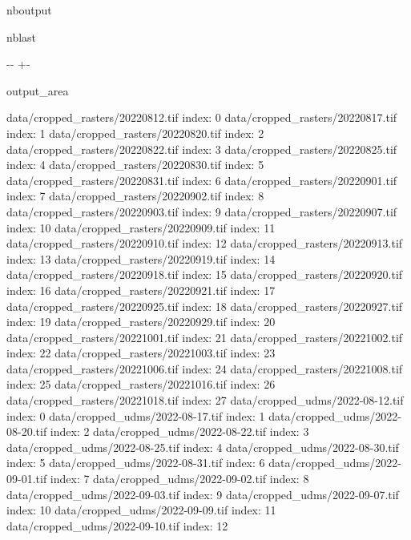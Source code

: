 \documentclass[letterpaper,10pt]{sphinxmanual}
\newlength\nbsphinxcodecellspacing
\begin{document}
\begin{sphinxuseclass}{nboutput}
\begin{sphinxuseclass}{nblast}
{

\kern-\sphinxverbatimsmallskipamount\kern-\baselineskip
\kern+\FrameHeightAdjust\kern-\fboxrule
\vspace{\nbsphinxcodecellspacing}

\begin{sphinxuseclass}{output_area}
\begin{sphinxuseclass}{}


\begin{sphinxVerbatim}[commandchars=\\\{\}]
data/cropped\_rasters/20220812.tif  index:  0
data/cropped\_rasters/20220817.tif  index:  1
data/cropped\_rasters/20220820.tif  index:  2
data/cropped\_rasters/20220822.tif  index:  3
data/cropped\_rasters/20220825.tif  index:  4
data/cropped\_rasters/20220830.tif  index:  5
data/cropped\_rasters/20220831.tif  index:  6
data/cropped\_rasters/20220901.tif  index:  7
data/cropped\_rasters/20220902.tif  index:  8
data/cropped\_rasters/20220903.tif  index:  9
data/cropped\_rasters/20220907.tif  index:  10
data/cropped\_rasters/20220909.tif  index:  11
data/cropped\_rasters/20220910.tif  index:  12
data/cropped\_rasters/20220913.tif  index:  13
data/cropped\_rasters/20220919.tif  index:  14
data/cropped\_rasters/20220918.tif  index:  15
data/cropped\_rasters/20220920.tif  index:  16
data/cropped\_rasters/20220921.tif  index:  17
data/cropped\_rasters/20220925.tif  index:  18
data/cropped\_rasters/20220927.tif  index:  19
data/cropped\_rasters/20220929.tif  index:  20
data/cropped\_rasters/20221001.tif  index:  21
data/cropped\_rasters/20221002.tif  index:  22
data/cropped\_rasters/20221003.tif  index:  23
data/cropped\_rasters/20221006.tif  index:  24
data/cropped\_rasters/20221008.tif  index:  25
data/cropped\_rasters/20221016.tif  index:  26
data/cropped\_rasters/20221018.tif  index:  27
data/cropped\_udms/2022-08-12.tif  index:  0
data/cropped\_udms/2022-08-17.tif  index:  1
data/cropped\_udms/2022-08-20.tif  index:  2
data/cropped\_udms/2022-08-22.tif  index:  3
data/cropped\_udms/2022-08-25.tif  index:  4
data/cropped\_udms/2022-08-30.tif  index:  5
data/cropped\_udms/2022-08-31.tif  index:  6
data/cropped\_udms/2022-09-01.tif  index:  7
data/cropped\_udms/2022-09-02.tif  index:  8
data/cropped\_udms/2022-09-03.tif  index:  9
data/cropped\_udms/2022-09-07.tif  index:  10
data/cropped\_udms/2022-09-09.tif  index:  11
data/cropped\_udms/2022-09-10.tif  index:  12

\end{sphinxVerbatim}
\end{sphinxuseclass}
\end{sphinxuseclass}}
\end{sphinxuseclass}
\end{sphinxuseclass}
\end{document}
